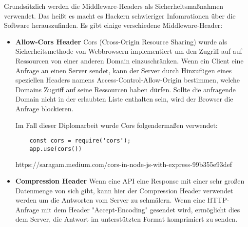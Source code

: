 Grundsätzlich werden die Middleware-Headers als Sicherheitsmaßnahmen verwendet. Das heißt es macht es Hackern schwieriger Infomrationen über die Software herauszufinden. Es gibt einige verschiedene Middleware-Header:

\begin{itemize}
    \item \textbf{Allow-Cors Header}
        \newline
        Cors (Cross-Origin Resource Sharing) wurde als Sicherheitsmethode von Webbrowsern implementiert um den Zugriff auf auf Ressourcen von einer anderen Domain einzuschränken. Wenn ein Client eine Anfrage an einen Server sendet, kann der Server durch Hinzufügen eines speziellen Headers namens Access-Control-Allow-Origin bestimmen, welche Domains Zugriff auf seine Ressourcen haben dürfen. Sollte die anfragende Domain nicht in der erlaubten Liste enthalten sein, wird der Browser die Anfrage blockieren.

        Im Fall dieser Diplomarbeit wurde Cors folgendermaßen verwendet:

\begin{lstlisting}
    const cors = require('cors');
    app.use(cors())
\end{lstlisting}
        

        \cite{Cors}
        https://saragam.medium.com/cors-in-node-js-with-express-99b355e93def
    \item \textbf{Compression Header}
        \newline
        Wenn eine API eine Response mit einer sehr großen Datenmenge von sich gibt, kann hier der Compression Header verwendet werden um die Antworten vom Server zu schmälern. Wenn eine HTTP-Anfrage mit dem Header "Accept-Encoding" gesendet wird, ermöglicht dies dem Server, die Antwort im unterstützten Format komprimiert zu senden.


\end{itemize}
